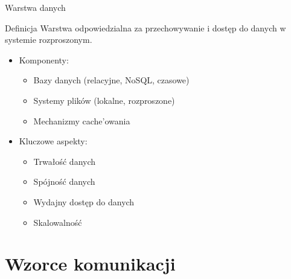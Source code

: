 \documentclass[aspectratio=169]{beamer}
\begin{document}
\begin{frame}{Warstwa danych}
    \begin{block}{Definicja}
        Warstwa odpowiedzialna za przechowywanie i dostęp do danych w systemie rozproszonym.
    \end{block}
    
    \begin{itemize}
        \item Komponenty:
        \begin{itemize}
            \item Bazy danych (relacyjne, NoSQL, czasowe)
            \item Systemy plików (lokalne, rozproszone)
            \item Mechanizmy cache'owania
        \end{itemize}
        \vspace{0.3cm}
        \item Kluczowe aspekty:
        \begin{itemize}
            \item Trwałość danych
            \item Spójność danych
            \item Wydajny dostęp do danych
            \item Skalowalność
        \end{itemize}
    \end{itemize}
\end{frame}

\section{Wzorce komunikacji}
\end{document}
